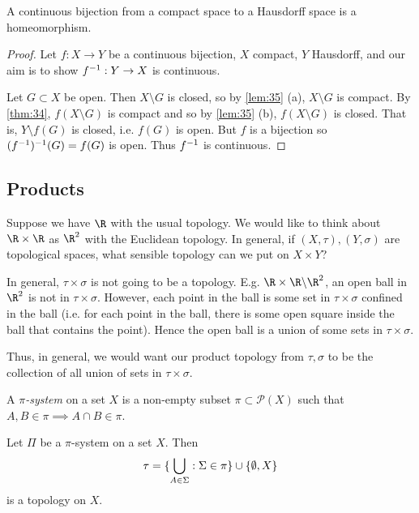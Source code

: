 \begin{theorem} \label{thm:36}
A continuous bijection from a compact space to a Hausdorff space is a homeomorphism.
\end{theorem}   

\begin{proof}
    Let $f: X \to Y$ be a continuous bijection, $X$ compact, $Y$ Hausdorff, and our aim is to show $f^{-1} : Y \to X$ is continuous.

    Let $G\subset X$ be open. Then $X \setminus G$ is closed, so by \cref{lem:35} (a), $X \setminus G$ is compact.
    By \cref{thm:34}, $f(X \setminus G)$ is compact and so by \cref{lem:35} (b), $f(X \setminus G)$ is closed.
    That is, $Y \setminus f(G)$ is closed, i.e. $f(G)$ is open.
    But $f$ is a bijection so $(f^{-1})^{-1} (G) = f(G)$ is open. Thus $f^{-1}$ is continuous.
\end{proof}

\subsection{Products}
Suppose we have $\R$ with the usual topology. We would like to think about $\R \times \R$ as $\R^2$ with the Euclidean topology. In general, if $(X,\tau), (Y,\sigma)$ are topological spaces, what sensible topology can we put on $X\times Y$? 

In general, $\tau \times \sigma$ is not going to be a topology. E.g. $\R\times \R \backslash \R^2$, an open ball in $\R^2$ is not in $\tau\times \sigma$. However, each point in the ball is some set in $\tau\times \sigma$ confined in the ball (i.e. for each point in the ball, there is some open square inside the ball that contains the point). Hence the open ball is a union of some sets in $\tau \times \sigma$.

Thus, in general, we would want our product topology from $\tau,\sigma$ to be the collection of all union of sets in $\tau \times\sigma$.

\begin{definition}
A \emph{$\pi$-system} on a set $X$ is a non-empty subset $\pi\subset \mathcal{P}(X)$ such that $A,B\in \pi \implies A\cap B\in \pi$.
\end{definition}

\begin{proposition}                            %
Let $\Pi$ be a $\pi$-system on a set $X$. Then \[\tau = \{\bigcup_{A\in \Sigma} : \Sigma\in \pi\} \cup \{\emptyset, X\} \] is a topology on $X$.
\end{proposition}  

